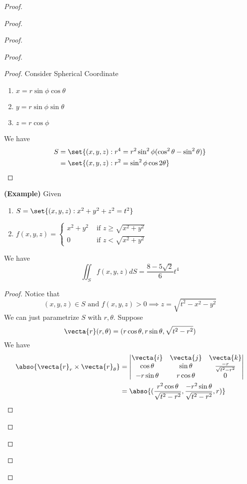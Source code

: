 \documentclass{report}
\begin{document}
\begin{proof}
\begin{proof}
\begin{proof}
\begin{proof}
\begin{proof}
Consider Spherical Coordinate 
\begin{enumerate}[label=(\alph*)]
  \item $x=r\sin \phi \cos \theta$
  \item $y=r\sin \phi \sin \theta$
  \item $z=r\cos \phi$
\end{enumerate}
We have 
\begin{align*}
S&=\set{(x,y,z):r^4=r^2 \sin^2 \phi (\cos^2 \theta - \sin^2 \theta)}\\
&=\set{(x,y,z):r^2=\sin^2 \phi \cos 2\theta}
\end{align*}
\end{proof}
\begin{theorem}
\label{10.1.9}
\textbf{(Example)} Given 
\begin{enumerate}[label=(\alph*)]
  \item $S=\set{(x,y,z):x^2+y^2+z^2=t^2}$
  \item $f(x,y,z)=\begin{cases}
  x^2+y^2& \text{ if $z\geq \sqrt{x^2+y^2} $ }\\
  0& \text{ if $z<\sqrt{x^2+y^2} $ }
\end{cases}$
\end{enumerate}
We have 
\begin{equation*}
\iint_S f(x,y,z) dS=\frac{8-5\sqrt{2} }{6}t^4
\end{equation*}
\end{theorem}
\begin{proof}
Notice that 
\begin{equation*}
  (x,y,z)\in S\text{ and }f(x,y,z)>0 \implies z=\sqrt{t^2-x^2-y^2} 
\end{equation*}
We can just parametrize $S$ with  $r,\theta$. Suppose 
\begin{equation*}
\vecta{r}(r,\theta )=(r \cos \theta ,r \sin \theta,\sqrt{t^2-r^2}  )
\end{equation*}
We have 
\begin{align*}
  \abso{\vecta{r}_r\times \vecta{r}_\theta}&= \begin{vmatrix} 
  \vecta{i} & \vecta{j} & \vecta{k}\\
  \cos \theta & \sin \theta & \frac{-r}{\sqrt{t^2-r^2} }\\
  -r\sin \theta & r\cos \theta & 0
\end{vmatrix}\\
                                            &=\abso{(\frac{r^2\cos \theta }{\sqrt{t^2-r^2} },\frac{-r^2 \sin \theta }{\sqrt{t^2-r^2} },r)}\\

\end{align*}
\end{proof}
\end{proof}
\end{proof}
\end{proof}
\end{proof}
\end{document}
